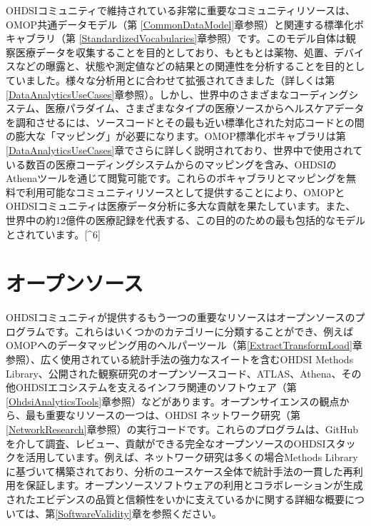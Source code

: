 \documentclass[
  11pt]{book}
\theoremstyle{definition}
\theoremstyle{definition}
\theoremstyle{definition}
\theoremstyle{definition}
\theoremstyle{remark}
\begin{document}

OHDSIコミュニティで維持されている非常に重要なコミュニティリソースは、OMOP共通データモデル（第 \ref{CommonDataModel}章参照）と関連する標準化ボキャブラリ（第 \ref{StandardizedVocabularies}章参照）です。このモデル自体は観察医療データを収集することを目的としており、もともとは薬物、処置、デバイスなどの曝露と、状態や測定値などの結果との関連性を分析することを目的としていました。様々な分析用とに合わせて拡張されてきました（詳しくは第\ref{DataAnalyticsUseCases}章参照）。しかし、世界中のさまざまなコーディングシステム、医療パラダイム、さまざまなタイプの医療ソースからヘルスケアデータを調和させるには、ソースコードとその最も近い標準化された対応コードとの間の膨大な「マッピング」が必要になります。OMOP標準化ボキャブラリは第 \ref{DataAnalyticsUseCases}章でさらに詳しく説明されており、世界中で使用されている数百の医療コーディングシステムからのマッピングを含み、OHDSIのAthenaツールを通じて閲覧可能です。これらのボキャブラリとマッピングを無料で利用可能なコミュニティリソースとして提供することにより、OMOPとOHDSIコミュニティは医療データ分析に多大な貢献を果たしています。また、世界中の約12億件の医療記録を代表する、この目的のための最も包括的なモデルとされています。{[}\^{}6{]} \citep{garza_2016}

\section{オープンソース}\label{ux30aaux30fcux30d7ux30f3ux30bdux30fcux30b9}


OHDSIコミュニティが提供するもう一つの重要なリソースはオープンソースのプログラムです。これらはいくつかのカテゴリーに分類することができ、例えばOMOPへのデータマッピング用のヘルパーツール（第\ref{ExtractTransformLoad}章参照）、広く使用されている統計手法の強力なスイートを含むOHDSI Methods Library、公開された観察研究のオープンソースコード、ATLAS、Athena、その他OHDSIエコシステムを支えるインフラ関連のソフトウェア（第\ref{OhdsiAnalyticsTools}章参照）などがあります。オープンサイエンスの観点から、最も重要なリソースの一つは、OHDSI ネットワーク研究（第\ref{NetworkResearch}章参照）の実行コードです。これらのプログラムは、GitHubを介して調査、レビュー、貢献ができる完全なオープンソースのOHDSIスタックを活用しています。例えば、ネットワーク研究は多くの場合Methods Libraryに基づいて構築されており、分析のユースケース全体で統計手法の一貫した再利用を保証します。オープンソースソフトウェアの利用とコラボレーションが生成されたエビデンスの品質と信頼性をいかに支えているかに関する詳細な概要については、第\ref{SoftwareValidity}章を参照ください。
\end{document}
